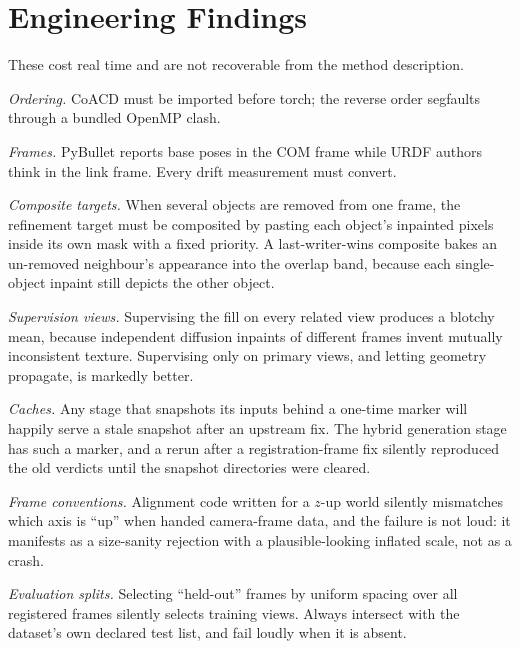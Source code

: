\section{Engineering Findings}
\label{app:engineering}
These cost real time and are not recoverable from the method description.

\emph{Ordering.} CoACD must be imported before torch; the reverse order
segfaults through a bundled OpenMP clash.

\emph{Frames.} PyBullet reports base poses in the COM frame while URDF
authors think in the link frame. Every drift measurement must convert.

\emph{Composite targets.} When several objects are removed from one frame,
the refinement target must be composited by pasting each object's
inpainted pixels inside its own mask with a fixed priority. A
last-writer-wins composite bakes an un-removed neighbour's appearance into
the overlap band, because each single-object inpaint still depicts the
other object.

\emph{Supervision views.} Supervising the fill on every related view
produces a blotchy mean, because independent diffusion inpaints of
different frames invent mutually inconsistent texture. Supervising only on
primary views, and letting geometry propagate, is markedly better.

\emph{Caches.} Any stage that snapshots its inputs behind a one-time
marker will happily serve a stale snapshot after an upstream fix. The
hybrid generation stage has such a marker, and a rerun after a
registration-frame fix silently reproduced the old verdicts until the
snapshot directories were cleared.

\emph{Frame conventions.} Alignment code written for a $z$-up world
silently mismatches which axis is ``up'' when handed camera-frame data,
and the failure is not loud: it manifests as a size-sanity rejection with
a plausible-looking inflated scale, not as a crash.

\emph{Evaluation splits.} Selecting ``held-out'' frames by uniform spacing
over all registered frames silently selects training views. Always
intersect with the dataset's own declared test list, and fail loudly when
it is absent.
